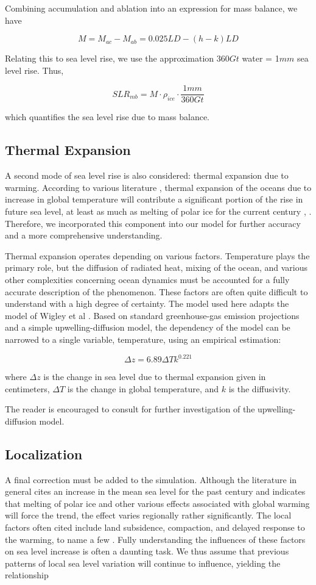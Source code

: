 \documentclass[12pt,a4paper,titlepage]{article}
\begin{document}
Combining accumulation and ablation into an expression for mass
balance, we have

\[
M=M_{ac}-M_{ab}=0.025LD-(h-k)LD
\]

Relating this to sea level rise, we use the approximation 360$Gt$
water = 1$mm$ sea level rise. Thus,

\[
SLR_{mb}=M\cdot\rho_{ice}\cdot\frac{1mm}{360Gt}
\]

which quantifies the sea level rise due to mass balance.

\subsection{Thermal Expansion}

A second mode of sea level rise is also considered: thermal
expansion due to warming. According to various literature ,
thermal expansion of the oceans due to increase in global
temperature will contribute a significant portion of the rise in
future sea level, at least as much as melting of polar ice for the
current century , . Therefore, we incorporated this component into
our model for further accuracy and a more comprehensive
understanding.

Thermal expansion operates depending on various factors.
Temperature plays the primary role, but the diffusion of radiated
heat, mixing of the ocean, and various other complexities
concerning ocean dynamics must be accounted for a fully accurate
description of the phenomenon. These factors are often quite
difficult to understand with a high degree of certainty. The model
used here adapts the model of Wigley et al . Based on standard
greenhouse-gas emission projections and a simple
upwelling-diffusion model, the dependency of the model can be
narrowed to a single variable, temperature, using an empirical
estimation:

\[
\Delta z=6.89\Delta Tk^{0.221}
\]

where $\Delta z$ is the change in sea level due to thermal
expansion given in centimeters, $\Delta T$ is the change in global
temperature, and $k$ is the diffusivity.

The reader is encouraged to consult for further investigation of
the upwelling-diffusion model.

\subsection{Localization}

A final correction must be added to the simulation. Although the
literature in general cites an increase in the mean sea level for
the past century and indicates that melting of polar ice and other
various effects associated with global warming will force the
trend, the effect varies regionally rather significantly. The
local factors often cited include land subsidence, compaction, and
delayed response to the warming, to name a few . Fully
understanding the influences of these factors on sea level
increase is often a daunting task. We thus assume that previous
patterns of local sea level variation will continue to influence,
yielding the relationship
\end{document}
